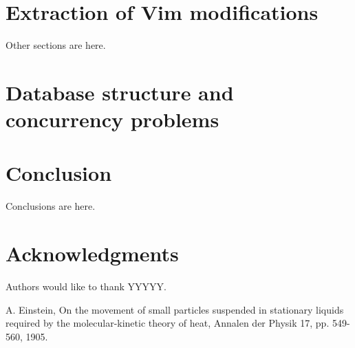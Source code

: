 \documentclass{llncs}
\begin{document}
\section{Extraction of Vim modifications}\label{sec:Others}

Other sections are here. 

\section{Database structure and concurrency problems}\label{sec:Others}

\section{Conclusion}\label{sec:Conclusion}

Conclusions are here.

\section*{Acknowledgments}\label{sec:Acknowledgments}

Authors would like to thank YYYYY.

\begin{thebibliography}{1}

A. Einstein, On the movement of small particles suspended in stationary liquids required by the molecular-kinetic theory of heat, Annalen der Physik 17, pp. 549-560, 1905.

\end{thebibliography}
\end{document}
